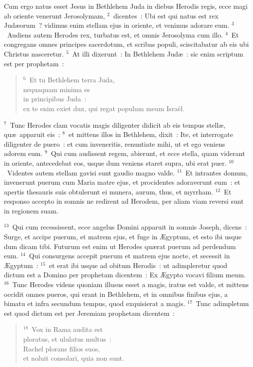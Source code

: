 \lettrine[lines=10,image=true,loversize=0.05,lraise=-0.03]{C}{}um ergo natus esset Jesus in Bethlehem Juda in diebus Herodis regis, ecce magi ab oriente venerunt Jerosolymam,
${}^{2}$~dicentes~: Ubi est qui natus est rex Jud\ae orum~? vidimus enim stellam ejus in oriente, et venimus adorare eum.
${}^{3}$~Audiens autem Herodes rex, turbatus est, et omnis Jerosolyma cum illo.
${}^{4}$~Et congregans omnes principes sacerdotum, et scribas populi, sciscitabatur ab eis ubi Christus nasceretur.
${}^{5}$~At illi dixerunt~: In Bethlehem Jud\ae~: sic enim scriptum est per prophetam~:
\begin{flushleft}\begin{verse}${}^{6}$~Et tu Bethlehem terra Juda,\\ nequaquam minima es\\ in principibus Juda~:\\ ex te enim exiet dux, qui regat populum meum Isra\"el.\end{verse}\end{flushleft}


${}^{7}$~Tunc Herodes clam vocatis magis diligenter didicit ab eis tempus stell\ae , qu\ae\ apparuit eis~:
${}^{8}$~et mittens illos in Bethlehem, dixit~: Ite, et interrogate diligenter de puero~: et cum inveneritis, renuntiate mihi, ut et ego veniens adorem eum.
${}^{9}$~Qui cum audissent regem, abierunt, et ecce stella, quam viderant in oriente, antecedebat eos, usque dum veniens staret supra, ubi erat puer.
${}^{10}$~Videntes autem stellam gavisi sunt gaudio magno valde.
${}^{11}$~Et intrantes domum, invenerunt puerum cum Maria matre ejus, et procidentes adoraverunt eum~: et apertis thesauris suis obtulerunt ei munera, aurum, thus, et myrrham.
${}^{12}$~Et responso accepto in somnis ne redirent ad Herodem, per aliam viam reversi sunt in regionem suam.


${}^{13}$~Qui cum recessissent, ecce angelus Domini apparuit in somnis Joseph, dicens~: Surge, et accipe puerum, et matrem ejus, et fuge in \AE gyptum, et esto ibi usque dum dicam tibi. Futurum est enim ut Herodes qu\ae rat puerum ad perdendum eum.
${}^{14}$~Qui consurgens accepit puerum et matrem ejus nocte, et secessit in \AE gyptum~:
${}^{15}$~et erat ibi usque ad obitum Herodis~: ut adimpleretur quod dictum est a Domino per prophetam dicentem~: Ex \AE gypto vocavi filium meum.
${}^{16}$~Tunc Herodes videns quoniam illusus esset a magis, iratus est valde, et mittens occidit omnes pueros, qui erant in Bethlehem, et in omnibus finibus ejus, a bimatu et infra secundum tempus, quod exquisierat a magis.
${}^{17}$~Tunc adimpletum est quod dictum est per Jeremiam prophetam dicentem~:
\begin{flushleft}\begin{verse}${}^{18}$~Vox in Rama audita est\\ ploratus, et ululatus multus~:\\ Rachel plorans filios suos,\\ et noluit consolari, quia non sunt.\end{verse}\end{flushleft}


